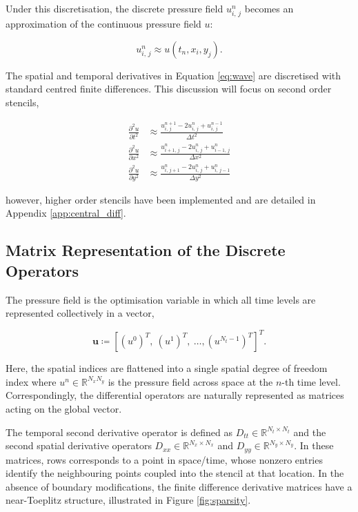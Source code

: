 \documentclass[final-report]{report-template}
\newcommand{\utt}{\frac {\partial^2 u} {\partial t^2}}
\begin{document}
Under this discretisation, the discrete pressure field $u^n_{i,\, j}$ becomes an approximation of the continuous pressure field $u$:

\begin{equation}
    u^n_{i,\, j} \approx u(t_n, x_i, y_j).
    \label{eq:approxu}
\end{equation}

The spatial and temporal derivatives in Equation \eqref{eq:wave} are discretised with standard centred finite differences. This discussion will focus on second order stencils,

\begin{align}
    \utt &\approx \frac {u^{n+1}_{i,\, j} - 2u^{n}_{i,\, j} + u^{n-1}_{i,\, j}} {\Delta t^2} \label{eq:uttcd}\\[2pt]
    \frac{\partial^2 u}{\partial x^2} &\approx \frac {u^{n}_{i + 1,\, j} - 2u^{n}_{i,\, j} + u^{n}_{i-1,\, j}} {\Delta x^2} \label{eq:uxxcd}\\[2pt]
    \frac{\partial^2 u}{\partial y^2} &\approx \frac {u^{n}_{i,\, j+1} - 2u^{n}_{i,\, j} + u^{n}_{i,\, j-1}} {\Delta y^2} \label{eq:uyycd}
\end{align}

however, higher order stencils have been implemented and are detailed in Appendix \ref{app:central_diff}.

\subsection{Matrix Representation of the Discrete Operators}
\label{subsubsect:disc_op}

The pressure field is the optimisation variable in which all time levels are represented collectively in a vector, 

\begin{equation}
    \mathbf{u} \coloneqq \left[\left(u^0\right)^T,\ \left(u^1\right)^T,\ \dots,\left(u^{N_t - 1}\right)^T\right]^T.
    \label{eq:u_vec}
\end{equation} 

Here, the spatial indices are flattened into a single spatial degree of freedom index where $u^n \in \mathbb{R}^{N_x N_y}$ is the pressure field across space at the $n$-th time level. Correspondingly, the differential operators are naturally represented as matrices acting on the global vector.

The temporal second derivative operator is defined as $D_{tt} \in \mathbb{R}^{N_t \times N_t}$ and the second spatial derivative operators $D_{xx} \in \mathbb{R}^{N_x \times N_x}$ and $D_{yy} \in \mathbb{R}^{N_y \times N_y}$. In these matrices, rows corresponds to a point in space/time, whose nonzero entries identify the neighbouring points coupled into the stencil at that location. In the absence of boundary modifications, the finite difference derivative matrices have a near-Toeplitz structure, illustrated in Figure \ref{fig:sparsity}.
\end{document}
